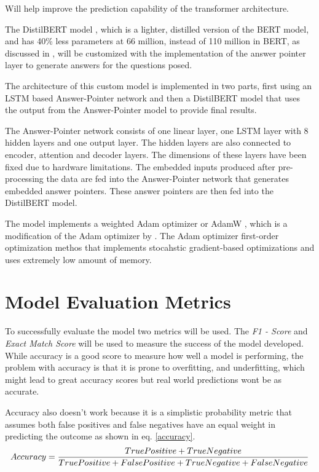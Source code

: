 \documentclass[a4paper,12pt]{report}
\begin{document}
	Will help improve the prediction capability of the transformer architecture.

	The DistilBERT model \citep{distil}, which is a lighter, distilled version of the BERT model, and has 40\% less parameters at 66 million, instead of 110 million in BERT, as discussed in \citep{bert}, will be customized with the implementation of the answer pointer layer to generate answers for the questions posed.

	The architecture of this custom model is implemented in two parts, first using an LSTM based Answer-Pointer network and then a DistilBERT model that uses the output from the Answer-Pointer model to provide final results.
	
	The Answer-Pointer network consists of one linear layer, one LSTM layer with 8 hidden layers and one output layer. The hidden layers are also connected to encoder, attention and decoder layers. The dimensions of these layers have been fixed due to hardware limitations. The embedded inputs produced after pre-processing the data are fed into the Answer-Pointer network that generates embedded answer pointers. These answer pointers are then fed into the DistilBERT model.
	
	The model implements a weighted Adam optimizer or AdamW \citep{DBLP:journals/corr/abs-1711-05101}, which is a modification of the Adam optimizer  by \citep{kingma2014adam}. The Adam optimizer first-order optimization methos that implements stocahstic gradient-based optimizations and uses extremely low amount of memory.
	
	\section{Model Evaluation Metrics}\label{33}

		To successfully evaluate the model two metrics will be used. The \textit{F1 - Score} and \textit{Exact Match Score} will be used to measure the success of the model developed. While accuracy is a good score to measure how well a model is performing, the problem with accuracy is that it is prone to overfitting, and underfitting, which might lead to great accuracy scores but real world predictions wont be as accurate.

		Accuracy also doesn't work because it is a simplistic probability metric that assumes both false positives and false negatives have an equal weight in predicting the outcome as shown in eq. \ref{accuracy}.
				\begin{equation}\label{accuracy}
			Accuracy = \small \dfrac{True Positive + True Negative}{True Positive + False Positive + True Negative + False Negative}
		\end{equation}
\end{document}
